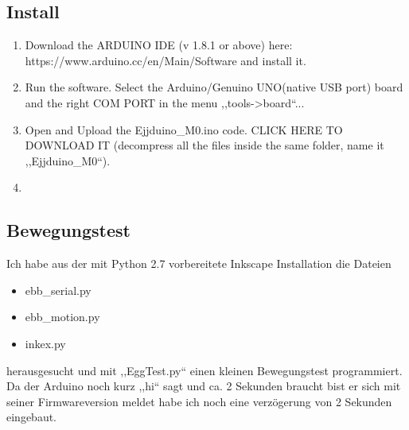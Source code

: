\subsection{Install}
\begin{enumerate}
  \item Download the ARDUINO IDE (v 1.8.1 or above) here: https://www.arduino.cc/en/Main/Software and install it.
  \item Run the software. Select the Arduino/Genuino UNO(native USB port) board and the right COM PORT in the menu ,,tools->board``...
  \item Open and Upload the Ejjduino\_M0.ino code. CLICK HERE TO DOWNLOAD IT (decompress all the files inside the same folder, name it ,,Ejjduino\_M0``).
  \item 
\end{enumerate}

\subsection{Bewegungstest}
Ich habe aus der mit Python 2.7 vorbereitete Inkscape Installation die Dateien
\begin{itemize}
\item ebb\_serial.py
\item ebb\_motion.py
\item inkex.py
\end{itemize}
herausgesucht und mit ,,EggTest.py`` einen kleinen Bewegungstest programmiert. Da der Arduino noch kurz ,,hi`` sagt und  ca. 2 Sekunden braucht bist er sich mit seiner Firmwareversion meldet habe ich noch eine verzögerung von 2 Sekunden eingebaut.\\


